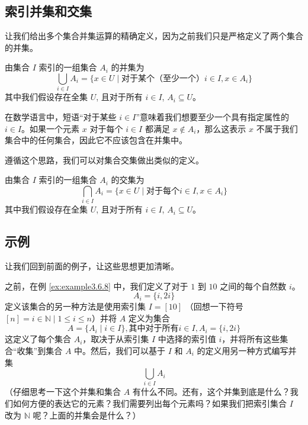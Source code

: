 \subsection{索引并集和交集}\label{sec:section3.6.2}

让我们给出多个集合并集运算的精确定义，因为之前我们只是严格定义了两个集合的并集。

\begin{definition}\label{def:definition3.6.1}
    由集合 $I$ 索引的一组集合 $A_i$ 的并集为
    \[\bigcup_{i \in I} A_i = \{x \in U \mid \text{对于某个（至少一个）} i \in I, x \in A_i \}\]
    其中我们假设存在全集 $U$, 且对于所有 $i \in I$, $A_i \subseteq U$。
\end{definition}

在数学语言中，短语``对于某些 $i \in I$''意味着我们想要至少一个具有指定属性的 $i \in I$。如果一个元素 $x$ 对于每个 $i \in I$ 都满足 $x \notin A_i$，那么这表示 $x$ 不属于我们集合中的任何集合，因此它不应该包含在并集中。

遵循这个思路，我们可以对集合交集做出类似的定义。

\begin{definition}\label{def:definition3.6.2}
    由集合 $I$ 索引的一组集合 $A_i$ 的交集为
    \[\bigcap_{i \in I} A_i = \{x \in U \mid \text{对于每个} i \in I, x \in A_i \}\]
    其中我们假设存在全集 $U$, 且对于所有 $i \in I$, $A_i \subseteq U$。
\end{definition}

\subsection{示例}

让我们回到前面的例子，让这些思想更加清晰。\\

\begin{example}
    之前，在例 \ref{ex:example3.6.8} 中，我们定义了对于 $1$ 到 $10$ 之间的每个自然数 $i$。
    \[A_i = \{i, 2i\}\]
    定义该集合的另一种方法是使用索引集 $I = [10]$ （回想一下符号 $[n] = {i \in \mathbb{N} \mid 1 \le i \le n}$）并将 $A$ 定义为集合
    \[A = \{A_i \mid i \in I\}, \text{其中对于所有} i \in I, A_i = \{i, 2i\}\]
    这定义了每个集合 $A_i$，取决于从索引集 $I$ 中选择的索引值 $i$，并将所有这些集合``收集''到集合 $A$ 中。然后，我们可以基于 $I$ 和 $A_i$ 的定义用另一种方式编写并集
    \[\bigcup_{i \in I} A_i\]
    （仔细思考一下这个并集和集合 $A$ 有什么不同。还有，这个并集到底是什么？我们如何方便的表达它的元素？我们需要列出每个元素吗？如果我们把索引集合 $I$ 改为 $\mathbb{N}$ 呢？上面的并集会是什么？）
\end{example}

